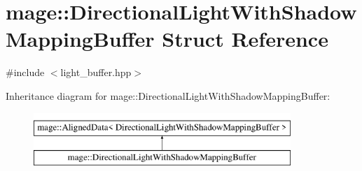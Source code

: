 \hypertarget{structmage_1_1_directional_light_with_shadow_mapping_buffer}{}\section{mage\+:\+:Directional\+Light\+With\+Shadow\+Mapping\+Buffer Struct Reference}
\label{structmage_1_1_directional_light_with_shadow_mapping_buffer}


{\ttfamily \#include $<$light\+\_\+buffer.\+hpp$>$}

Inheritance diagram for mage\+:\+:Directional\+Light\+With\+Shadow\+Mapping\+Buffer\+:\begin{figure}[H]
\begin{center}
\leavevmode
\includegraphics[height=2.000000cm]{structmage_1_1_directional_light_with_shadow_mapping_buffer}
\end{center}
\end{figure}
